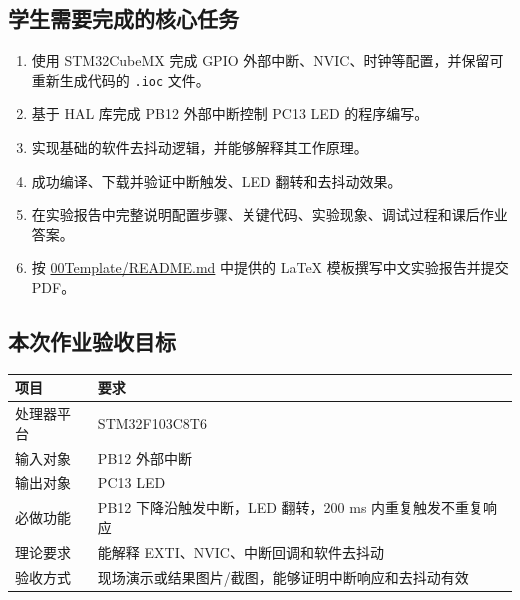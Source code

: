 \documentclass[
  chinese,
  UTF8,
  oneside,
  openany]{ctexbook}
\providecommand{\tightlist}{%
  \setlength{\itemsep}{0pt}\setlength{\parskip}{0pt}}
\begin{document}
\subsection{学生需要完成的核心任务}\label{ux5b66ux751fux9700ux8981ux5b8cux6210ux7684ux6838ux5fc3ux4efbux52a1-2}

\begin{enumerate}
\def\labelenumi{\arabic{enumi}.}
\tightlist
\item
  使用 STM32CubeMX 完成 GPIO
  外部中断、NVIC、时钟等配置，并保留可重新生成代码的 \texttt{.ioc}
  文件。
\item
  基于 HAL 库完成 PB12 外部中断控制 PC13 LED 的程序编写。
\item
  实现基础的软件去抖动逻辑，并能够解释其工作原理。
\item
  成功编译、下载并验证中断触发、LED 翻转和去抖动效果。
\item
  在实验报告中完整说明配置步骤、关键代码、实验现象、调试过程和课后作业答案。
\item
  按 \href{../00Template/README.md}{00Template/README.md} 中提供的 LaTeX
  模板撰写中文实验报告并提交 PDF。
\end{enumerate}

\subsection{本次作业验收目标}\label{ux672cux6b21ux4f5cux4e1aux9a8cux6536ux76eeux6807-2}

\begin{longtable}[]{@{}
  >{\raggedright\arraybackslash}p{}
  >{\raggedright\arraybackslash}p{}@{}}
\toprule\noalign{}
\begin{minipage}[b]{\linewidth}\raggedright
项目
\end{minipage} & \begin{minipage}[b]{\linewidth}\raggedright
要求
\end{minipage} \\
\midrule\noalign{}
\endhead
\bottomrule\noalign{}
\endlastfoot
处理器平台 & STM32F103C8T6 \\
输入对象 & PB12 外部中断 \\
输出对象 & PC13 LED \\
必做功能 & PB12 下降沿触发中断，LED 翻转，200 ms 内重复触发不重复响应 \\
理论要求 & 能解释 EXTI、NVIC、中断回调和软件去抖动 \\
验收方式 & 现场演示或结果图片/截图，能够证明中断响应和去抖动有效 \\
\end{longtable}
\end{document}
